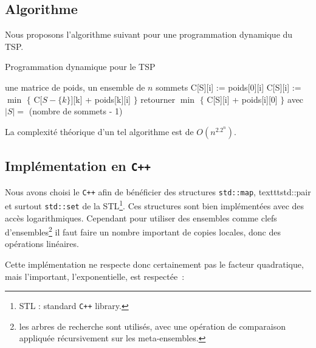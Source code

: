 \subsection{Algorithme}

Nous proposons l'algorithme suivant pour une programmation dynamique
du TSP.

\begin{algorithm}[!ht]
\caption{Programmation dynamique pour le TSP}
\label{Dyntsp}
\begin{algorithmic}[1]
\REQUIRE une matrice de poids, un ensemble de $n$ sommets
\STATE C[S][i] := poids[0][i]
\ENDFOR
\ELSE
{}
\STATE C[S][i] := $\min$ $\{$ C[$S - \{ k \} $][k] + poids[k][i] $\}$
\ENDFOR
\ENDFOR
\ENDIF
\ENDFOR
\STATE retourner $\min$ $\{$ C[S][i] + poids[i][0] $\}$ avec $|S| = $
(nombre de sommets - 1)
\end{algorithmic}
\end{algorithm}

La complexité théorique d'un tel algorithme est de $O(n^2.2^n)$.

\subsection{Implémentation en \texttt{C++}}

Nous avons choisi le \texttt{C++} afin de bénéficier des structures
\texttt{std::map}, texttt{std::pair} et surtout \texttt{std::set} de
la STL\footnote{STL : standard \texttt{C++} library.}. Ces structures
sont bien implémentées avec des accès logarithmiques. Cependant pour
utiliser des ensembles comme clefs d'ensembles\footnote{les arbres de
  recherche sont utilisés, avec une opération de comparaison appliquée
  récursivement sur les meta-ensembles.} il faut faire un nombre
important de copies locales, donc des opérations linéaires.

Cette implémentation ne respecte donc certainement pas le facteur
quadratique, mais l'important, l'exponentielle, est respectée~:

\vspace{0.5cm}

